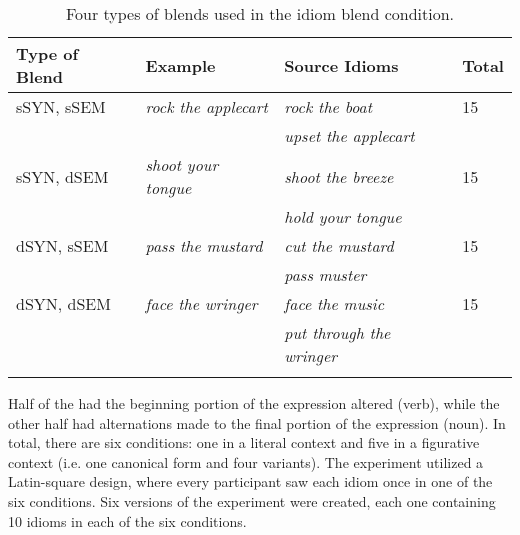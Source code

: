 \documentclass[output=paper
,modfonts
,nonflat]{langsci/langscibook}
\begin{document}
\begin{table}[h]
\begin{center}
\caption{\normalsize{Four types of blends used in the idiom blend condition. }}
\label{blendTypes}
\small{
\begin{tabular}{llll}
\lsptoprule
\bf{Type of Blend}&\textbf{Example}&\textbf{Source Idioms}&\textbf{Total}\\
\midrule
sSYN, sSEM&\textit{rock the applecart}&\textit{rock the boat}&15\\
&&\textit{upset the applecart}&\\
sSYN, dSEM&\textit{shoot your tongue}&\textit{shoot the breeze}&15\\
&&\textit{hold your tongue}&\\
dSYN, sSEM&\textit{pass the mustard}&\textit{cut the mustard}&15\\
&&\textit{pass muster}&\\
dSYN, dSEM&\textit{face the wringer}&\textit{face the music}&15\\
&&\textit{put through the wringer}&\\
\lspbottomrule
\end{tabular}
}
\end{center}
\end{table}


Half of the  had the beginning portion of the expression altered (verb), while the other half had alternations made to the final portion of the expression (noun). In total, there are six conditions: one in a literal context and five in a figurative context (i.e. one canonical form and four variants). The experiment utilized a Latin-square design, where every participant saw each idiom once in one of the six conditions. Six versions of the experiment were created, each one containing 10 idioms in each of the six conditions.\\
\end{document}
